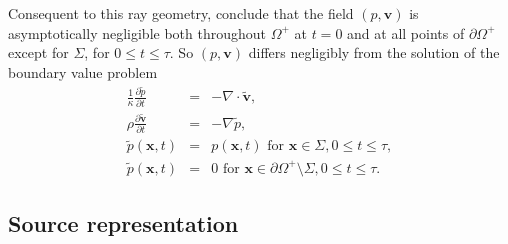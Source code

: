 \documentclass[georeport,12pt]{geophysics}
\newcommand{\bx}{\mathbf{x}}
\newcommand{\bv}{\mathbf{v}}
\begin{document}
Consequent to this ray geometry, conclude that the field $(p,\bv)$  is asymptotically negligible both
throughout $\Omega^+$ at $t=0$ and at all points of 
$\partial \Omega^+$ except for $\Sigma$, for $0\le t \le \tau$. So $(p,\bv)$ differs
negligibly from the solution of the boundary value problem 
\begin{eqnarray}
\label{eqn:aweloc}
  \frac{1}{\kappa}\frac{\partial \tilde{p}}{\partial t} & = & - \nabla \cdot \tilde{\bv}, \nonumber \\
  \rho\frac{\partial \tilde{\bv}}{\partial t} & = & - \nabla
                                                    \tilde{p}, \\
  \tilde{p}(\bx,t) & = & p(\bx,t) \mbox{ for } \bx \in \Sigma, 0 \le t \le 
  \tau,\\
  \tilde{p}(\bx,t) & = & 0 \mbox{ for } \bx \in \partial \Omega^+ \setminus \Sigma, 0 \le t \le
 \tau.
\end{eqnarray}

\subsection{Source representation}
\end{document}

